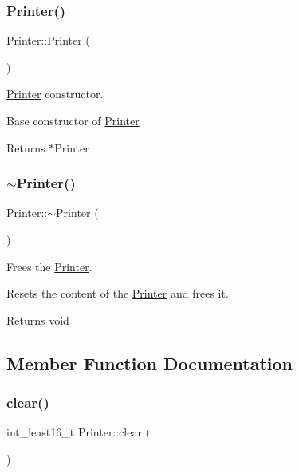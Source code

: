 \subsubsection{\texorpdfstring{Printer()}{Printer()}}
{\footnotesize\ttfamily Printer\+::\+Printer (\begin{DoxyParamCaption}{ }\end{DoxyParamCaption})}



\hyperlink{class_printer}{Printer} constructor. 

Base constructor of \hyperlink{class_printer}{Printer}

\begin{DoxyReturn}{Returns}
$\ast$\+Printer 
\end{DoxyReturn}
\mbox{\label{class_printer_a011da1d2aa31df5440071c0b6e80eb1d}} 
\subsubsection{\texorpdfstring{$\sim$\+Printer()}{~Printer()}}
{\footnotesize\ttfamily Printer\+::$\sim$\+Printer (\begin{DoxyParamCaption}{ }\end{DoxyParamCaption})}



Frees the \hyperlink{class_printer}{Printer}. 

Resets the content of the \hyperlink{class_printer}{Printer} and frees it.

\begin{DoxyReturn}{Returns}
void 
\end{DoxyReturn}


\subsection{Member Function Documentation}
\mbox{\label{class_printer_a5ed3289b1d1494ad44c0b56a48ad3e15}} 
\subsubsection{\texorpdfstring{clear()}{clear()}}
{\footnotesize\ttfamily int\+\_\+least16\+\_\+t Printer\+::clear (\begin{DoxyParamCaption}{ }\end{DoxyParamCaption})}



